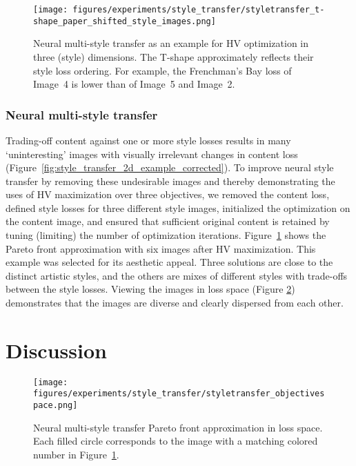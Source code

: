 \begin{figure}[h!]
\centering
\texttt{[image: figures/experiments/style\_transfer/styletransfer\_t-shape\_paper\_shifted\_style\_images.png]} %
\caption{Neural multi-style transfer as an example for HV optimization in three (style) dimensions. The T-shape approximately reflects their style loss ordering. For example, the Frenchman's Bay loss of Image~4 is lower than of Image~5 and Image~2.}%
\label{fig:style_transfer_tshape}
\end{figure}

\subsubsection{Neural multi-style transfer}
Trading-off content against one or more style losses results in many `uninteresting' images with visually irrelevant changes in content loss (Figure~\ref{fig:style_transfer_2d_example_corrected}). To improve neural style transfer by removing these undesirable images and thereby demonstrating the uses of HV maximization over three objectives, we removed the content loss, defined style losses for three different style images, initialized the optimization on the content image, and ensured that sufficient original content is retained by tuning (limiting) the number of optimization iterations.  Figure~\ref{fig:style_transfer_tshape} shows the Pareto front approximation with six images after HV maximization. This example was selected for its aesthetic appeal. Three solutions are close to the distinct artistic styles, and the others are mixes of different styles with trade-offs between the style losses. Viewing the images in loss space (Figure \ref{fig:style_transfer_objective_space}) demonstrates that the images are diverse and clearly dispersed from each other.\section{Discussion}
\label{sec:discussion}
\begin{figure}[!]
\centering
\texttt{[image: figures/experiments/style\_transfer/styletransfer\_objectivespace.png]}
\caption{Neural multi-style transfer Pareto front approximation in loss space. Each filled circle corresponds to the image with a matching colored number in Figure~\ref{fig:style_transfer_tshape}.}
\label{fig:style_transfer_objective_space}
\end{figure}

